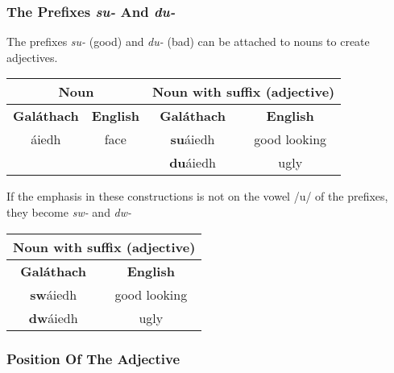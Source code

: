 \subsubsection{The Prefixes \textit{su-} And \textit{du-}}

The prefixes \textit{su-} (good) and \textit{du-} (bad) can be attached to nouns to create adjectives.
\begin{table}[H]
\centering
\begin{tabular}{cccc}
  \toprule
  \multicolumn{2}{c}{\textbf{Noun}} & \multicolumn{2}{c}{\textbf{Noun with suffix (adjective)}}\\
  \midrule
  \textbf{Gal\'{a}thach} & \textbf{English} & \textbf{Gal\'{a}thach} & \textbf{English}\\
  \cmidrule(lr){1-1}\cmidrule(lr){2-2}\cmidrule(lr){3-3}\cmidrule(lr){4-4}
  \'{a}iedh & face & \textbf{su}\'{a}iedh & good looking\\
  & & \textbf{du}\'{a}iedh & ugly\\
  \bottomrule
\end{tabular}
\label{examples_suffix_su_du}
\end{table}

If the emphasis in these constructions is not on the vowel /u/ of the prefixes, they become \textit{sw-} and \textit{dw-}
\begin{table}[H]
\centering
\begin{tabular}{cc}
  \toprule
  \multicolumn{2}{c}{\textbf{Noun with suffix (adjective)}}\\
  \midrule
  \textbf{Gal\'{a}thach} & \textbf{English}\\
  \cmidrule(lr){1-1}\cmidrule(lr){2-2}
  \textbf{sw}\'{a}iedh & good looking\\
  \textbf{dw}\'{a}iedh & ugly\\
  \bottomrule
\end{tabular}
\label{examples_suffix_sw_dw}
\end{table}

\subsubsection{Position Of The Adjective}

